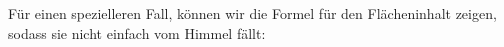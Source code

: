 \documentclass[12pt,a4paper]{article}
\theoremstyle{plain}
\newtheorem{Bemerkung}[Theorem]{Bemerkung}
\newcommand{\R}{\mathbb{R}}
\numberwithin{equation}{section}
\begin{document}
Für einen spezielleren Fall, können wir die Formel für den Flächeninhalt zeigen, sodass sie nicht einfach \glqq vom Himmel fällt\grqq :
\end{document}

